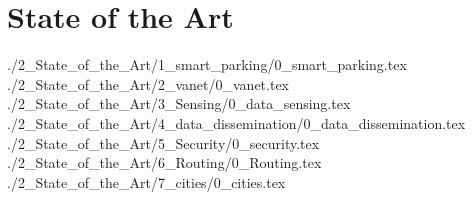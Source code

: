 \chapter{State of the Art}
{./2_State_of_the_Art/1_smart_parking/0_smart_parking.tex}
{./2_State_of_the_Art/2_vanet/0_vanet.tex}
{./2_State_of_the_Art/3_Sensing/0_data_sensing.tex}
{./2_State_of_the_Art/4_data_dissemination/0_data_dissemination.tex}
{./2_State_of_the_Art/5_Security/0_security.tex}
{./2_State_of_the_Art/6_Routing/0_Routing.tex}
{./2_State_of_the_Art/7_cities/0_cities.tex}






